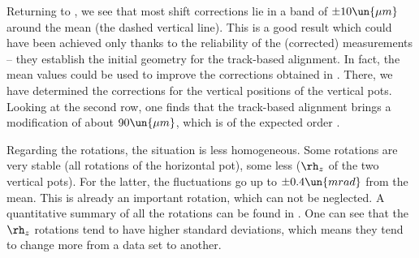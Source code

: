Returning to , we see that most shift corrections lie in a band of $\pm 10\un{\mu m}$ around the mean (the dashed vertical line). This is a good result which could have been achieved only thanks to the reliability of the (corrected)  measurements -- they establish the initial geometry for the track-based alignment. In fact, the mean values could be used to improve the corrections obtained in . There, we have determined the corrections for the vertical positions of the vertical pots. Looking at the second row, one finds that the track-based alignment brings a modification of about $90\un{\mu m}$, which is of the expected order .

Regarding the rotations, the situation is less homogeneous. Some rotations are very stable (all rotations of the horizontal pot), some less ($\rh_z$ of the two vertical pots). For the latter, the fluctuations go up to $\pm 0.4\un{mrad}$ from the mean. This is already an important rotation, which can not be neglected. A quantitative summary of all the  rotations can be found in . One can see that the $\rh_z$ rotations tend to have higher standard deviations, which means they tend to change more from a data set to another.


